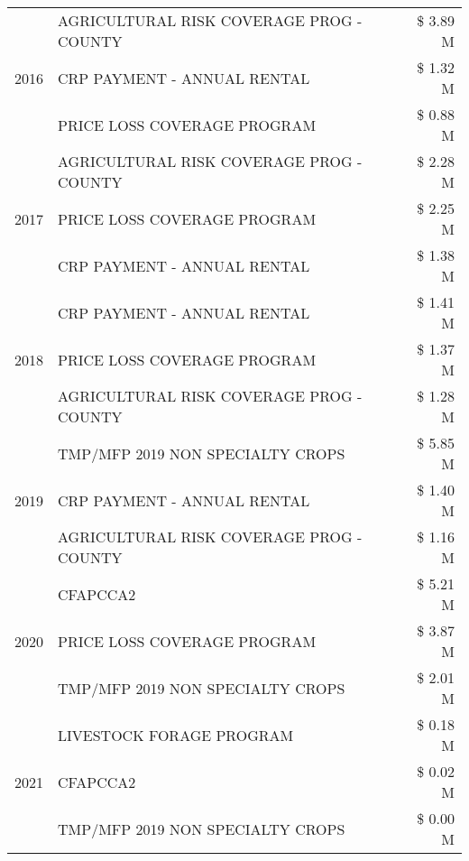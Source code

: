 \begin{tabular}{llr}
\cline{1-3}
\multirow[t]{3}{*}{2016} & AGRICULTURAL RISK COVERAGE PROG - COUNTY & \$ 3.89 M \\
 & CRP PAYMENT - ANNUAL RENTAL & \$ 1.32 M \\
 & PRICE LOSS COVERAGE PROGRAM & \$ 0.88 M \\
\cline{1-3}
\multirow[t]{3}{*}{2017} & AGRICULTURAL RISK COVERAGE PROG - COUNTY & \$ 2.28 M \\
 & PRICE LOSS COVERAGE PROGRAM & \$ 2.25 M \\
 & CRP PAYMENT - ANNUAL RENTAL & \$ 1.38 M \\
\cline{1-3}
\multirow[t]{3}{*}{2018} & CRP PAYMENT - ANNUAL RENTAL & \$ 1.41 M \\
 & PRICE LOSS COVERAGE PROGRAM & \$ 1.37 M \\
 & AGRICULTURAL RISK COVERAGE PROG - COUNTY & \$ 1.28 M \\
\cline{1-3}
\multirow[t]{3}{*}{2019} & TMP/MFP 2019 NON SPECIALTY CROPS & \$ 5.85 M \\
 & CRP PAYMENT - ANNUAL RENTAL & \$ 1.40 M \\
 & AGRICULTURAL RISK COVERAGE PROG - COUNTY & \$ 1.16 M \\
\cline{1-3}
\multirow[t]{3}{*}{2020} & CFAPCCA2 & \$ 5.21 M \\
 & PRICE LOSS COVERAGE PROGRAM & \$ 3.87 M \\
 & TMP/MFP 2019 NON SPECIALTY CROPS & \$ 2.01 M \\
\cline{1-3}
\multirow[t]{3}{*}{2021} & LIVESTOCK FORAGE PROGRAM & \$ 0.18 M \\
 & CFAPCCA2 & \$ 0.02 M \\
 & TMP/MFP 2019 NON SPECIALTY CROPS & \$ 0.00 M \\
\cline{1-3}
\bottomrule
\end{tabular}

